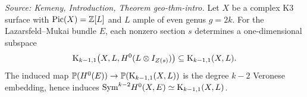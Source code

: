 \begin{theorem}
  \label{thm:kemeny_even_geometric_syzygy_structure}
  \textit{Source: Kemeny, Introduction, Theorem geo-thm-intro.}
  Let \(X\) be a complex K3 surface with \(\mathrm{Pic}(X)=\mathbb Z[L]\) and \(L\)
  ample of even genus \(g=2k\).  For the Lazarsfeld--Mukai bundle \(E\), each
  nonzero section \(s\) determines a one-dimensional subspace
  \[
    \mathrm{K}_{k-1,1}\bigl(X,L,H^0(L\otimes I_{Z(s)})\bigr)\subseteq \mathrm{K}_{k-1,1}(X,L).
  \]
  The induced map
  \(\mathbb{P}(H^0(E))\to \mathbb{P}(\mathrm{K}_{k-1,1}(X,L))\) is the degree \(k-2\) Veronese
  embedding, hence induces
  \(\mathrm{Sym}^{k-2}H^0(X,E)\simeq \mathrm{K}_{k-1,1}(X,L)\).
\end{theorem}

